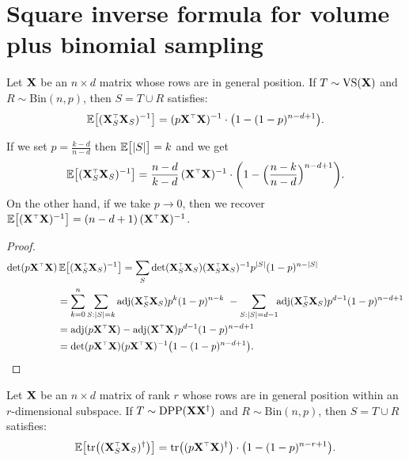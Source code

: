 \documentclass[12pt]{sty/colt2019/colt2018-arxiv}
\begin{document}
   \section{Square inverse formula for volume plus binomial sampling}
   \begin{theorem}\label{t:sqinv-binom}
     Let $\mathbf X$ be an $n\times d$ matrix whose rows are in general
     position. If $T\sim{\mathrm{VS}}(\mathbf X)$ and $R\sim\mathrm{Bin}(n,p)$, then
     $S=T\cup R$ satisfies:
     \begin{align*}
       \E\big[(\X_S^\top\X_S)^{-1}\big] = (p\X^\top\X)^{-1}\cdot \big(1-(1-p)^{n-d+1}\big).
     \end{align*}
   \end{theorem}
   \begin{remark}
     If we set $p = \frac{k-d}{n-d}$ then $\mathbb E\big[|S|\big]=k$ and we get
\[     \E\big[(\X_S^\top\X_S)^{-1}\big] =
  \frac{n-d}{k-d}\,(\X^\top\X)^{-1}\cdot\bigg(1-\Big(\frac{n-k}{n-d}\Big)^{n-d+1}\bigg).\]
On the other hand, if we take $p\rightarrow 0$, then we recover
$\E\big[(\X^\top\X)^{-1}\big] = (n-d+1)\,(\X^\top\X)^{-1}$. 
\end{remark}
     \begin{proof}
       \begin{align*}
         \det(p\X^\top\X)&\,\E\big[(\X_S^\top\X_S)^{-1}\big]
         = \sum_{S}\det(\X_S^\top\X_S)(\X_S^\top\X_S)^{-1}p^{|S|}(1-p)^{n-|S|}\\
          &=
            \sum_{k=0}^n\sum_{S:|S|=k}\adj(\X_S^\top\X_S)p^k(1-p)^{n-k}
            \ - \sum_{S:|S|=d-1}\!\!\adj(\X_S^\top\X_S)p^{d-1}(1-p)^{n-d+1}\\
         &=\adj(p\X^\top\X) - \adj(\X^\top\X)p^{d-1}(1-p)^{n-d+1}\\
         &=\det(p\X^\top\X)(p\X^\top\X)^{-1}\big(1-(1-p)^{n-d+1}\big).
       \end{align*}
     \end{proof}
     \begin{corollary}
  Let $\mathbf X$ be an $n\times d$ matrix of rank $r$ whose rows are in
  general position within an $r$-dimensional subspace. If $T\sim{\mathrm{DPP}}(\mathbf X\mathbf X^\dagger)$ and $R\sim\mathrm{Bin}(n,p)$, then
  $S=T\cup R$ satisfies:
  \begin{align*}
    \E\big[\tr\big((\X_S^\top\X_S)^\dagger\big)\big] =
    \tr\big((p\X^\top\X)^\dagger\big)\cdot \big(1-(1-p)^{n-r+1}\big).
  \end{align*}
     \end{corollary}
\end{document}
